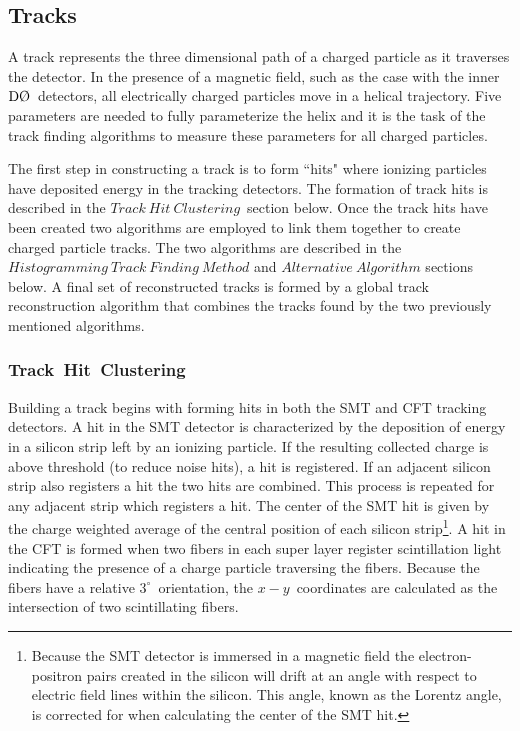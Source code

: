 \subsection{Tracks}
\label{trackreco}

A track represents the three dimensional path of a charged particle as it traverses the detector. In the presence of a magnetic field, such as the case with the inner $\dzero$~detectors, all electrically charged particles move in a helical trajectory. Five parameters are needed to fully parameterize the helix and it is the task of the track finding algorithms to measure these parameters for all charged particles.

The first step in constructing a track is to form ``hits" where ionizing particles have deposited energy in the tracking detectors. The formation of track hits is described in the $Track~Hit~Clustering$~section below. Once the track hits have been created two algorithms are employed to link them together to create charged particle tracks. The two algorithms are described in the $Histogramming~Track~Finding~Method$ and $Alternative~Algorithm$ sections below. A final set of reconstructed tracks is formed by a global track reconstruction algorithm that combines the tracks found by the two previously mentioned algorithms.

\subsubsection{Track~Hit~Clustering}

Building a track begins with forming hits in both the SMT and CFT tracking detectors. A hit in the SMT detector is characterized by the deposition of energy in a silicon strip left by an ionizing particle. If the resulting collected charge is above threshold (to reduce noise hits), a hit is registered. If an adjacent silicon strip also registers a hit the two hits are combined. This process is repeated for any adjacent strip which registers a hit. The center of the SMT hit is given by the charge weighted average of the central position of each silicon strip\footnote{Because the SMT detector is immersed in a magnetic field the electron-positron pairs created in the silicon will drift at an angle with respect to electric field lines within the silicon. This angle, known as the Lorentz angle, is corrected for when calculating the center of the SMT hit.}. A hit in the CFT is formed when two fibers in each super layer register scintillation light indicating the presence of a charge particle traversing the fibers. Because the fibers have a relative $3^{\circ}$~orientation, the $x-y$~coordinates are calculated as the intersection of two scintillating fibers. 

